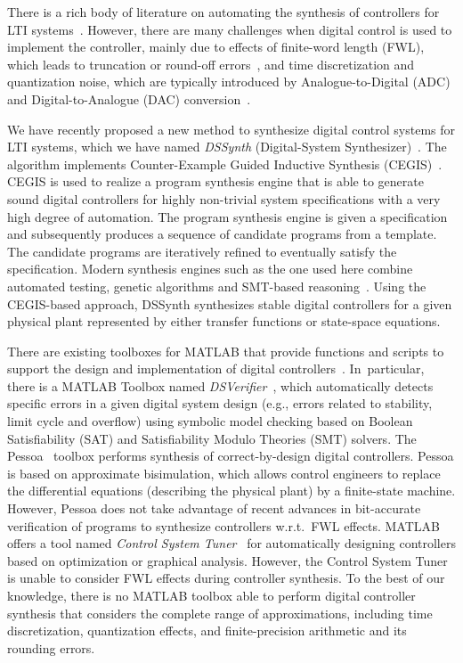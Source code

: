 \documentclass[10pt,conference]{IEEEtran}
\begin{document}
There is a rich body of literature on automating the synthesis of
controllers for LTI systems~\cite{mazo2010pessoa,
DBLP:conf/emsoft/RavanbakhshS16, economakos2016automated}.  However, there
are many challenges when digital control is used to implement the
controller, mainly due to effects of finite-word length (FWL), which leads
to truncation or round-off errors~\cite{Guang2013, Istepanian2001}, and time
discretization and quantization noise, which are typically introduced by
Analogue-to-Digital (ADC) and Digital-to-Analogue (DAC)
conversion~\cite{astrom1997computer}.

We have recently proposed a new method to synthesize digital control systems
for LTI systems, which we have named \emph{DSSynth} (Digital-System
Synthesizer)~\cite{abate2017, abatecav2017}.  The algorithm implements
Counter-Example Guided Inductive Synthesis
(CEGIS)~\cite{DBLP:conf/asplos/Solar-LezamaTBSS06}.  CEGIS is used to
realize a program synthesis engine that is able to generate sound digital
controllers for highly non-trivial system specifications with a very high
degree of automation.  The program synthesis engine is given a specification
and subsequently produces a sequence of candidate programs from a template. 
The candidate programs are iteratively refined to eventually satisfy the
specification.  Modern synthesis engines such as the one used here combine
automated testing, genetic algorithms and SMT-based
reasoning~\cite{DBLP:journals/corr/AlurFSS16a, DBLP:conf/lpar/DavidKL15}. 
Using the CEGIS-based approach, DSSynth synthesizes stable digital
controllers for a given physical plant represented by either transfer
functions or state-space equations.

There are existing toolboxes for MATLAB that provide functions and scripts
to support the design and implementation of digital
controllers~\cite{matlab-toolbox}.  In~particular, there is a MATLAB Toolbox
named \emph{DSVerifier}~\cite{issta2017, DBLP:journals/tc/BessaIPCF17,
DBLP:journals/dafes/BessaICF16}, which automatically detects specific errors
in a given digital system design (e.g., errors related to stability, limit
cycle and overflow) using symbolic model checking based on Boolean
Satisfiability (SAT) and Satisfiability Modulo Theories (SMT) solvers.  The
Pessoa~\cite{mazo2010pessoa} toolbox performs synthesis of correct-by-design
digital controllers.  Pessoa is based on approximate bisimulation, which
allows control engineers to replace the differential equations (describing the
physical plant) by a finite-state machine.  However, Pessoa does
not take advantage of recent advances in bit-accurate verification of
programs to synthesize controllers w.r.t.~FWL effects.  MATLAB offers a tool
named \emph{Control System Tuner}~\cite{autotuner} for automatically
designing controllers based on optimization or graphical analysis.  However,
the Control System Tuner is unable to consider FWL effects during controller
synthesis.  To the best of our knowledge, there is no MATLAB toolbox able to
perform digital controller synthesis that considers the complete range of
approximations, including time discretization, quantization effects, and
finite-precision arithmetic and its rounding errors.
\end{document}
